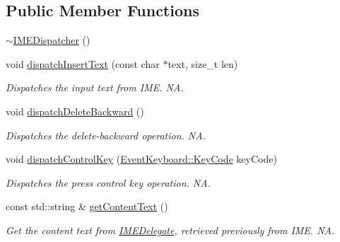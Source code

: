 \subsection*{Public Member Functions}
\begin{DoxyCompactItemize}
\item 
\hyperlink{classIMEDispatcher_a1324cb0b92e74c3c83a2b684732abe91}{$\sim$\+I\+M\+E\+Dispatcher} ()
\item 
\mbox{\label{classIMEDispatcher_a4600ab7b1ae11d351f0bd2cb411b02a5}} 
void \hyperlink{classIMEDispatcher_a4600ab7b1ae11d351f0bd2cb411b02a5}{dispatch\+Insert\+Text} (const char $\ast$text, size\+\_\+t len)
\begin{DoxyCompactList}\small\item\em Dispatches the input text from I\+ME.  NA. \end{DoxyCompactList}\item 
\mbox{\label{classIMEDispatcher_a77fc00411768c678ab6a09fe8890857c}} 
void \hyperlink{classIMEDispatcher_a77fc00411768c678ab6a09fe8890857c}{dispatch\+Delete\+Backward} ()
\begin{DoxyCompactList}\small\item\em Dispatches the delete-\/backward operation.  NA. \end{DoxyCompactList}\item 
\mbox{\label{classIMEDispatcher_a82a41660ae050d9d3124c83532ad26ca}} 
void \hyperlink{classIMEDispatcher_a82a41660ae050d9d3124c83532ad26ca}{dispatch\+Control\+Key} (\hyperlink{classEventKeyboard_a7cd3fa46515673276ce8ec7f0e051606}{Event\+Keyboard\+::\+Key\+Code} key\+Code)
\begin{DoxyCompactList}\small\item\em Dispatches the press control key operation.  NA. \end{DoxyCompactList}\item 
\mbox{\label{classIMEDispatcher_a6a308a4b3927d57a07859a19cd5718db}} 
const std\+::string \& \hyperlink{classIMEDispatcher_a6a308a4b3927d57a07859a19cd5718db}{get\+Content\+Text} ()
\begin{DoxyCompactList}\small\item\em Get the content text from \hyperlink{classIMEDelegate}{I\+M\+E\+Delegate}, retrieved previously from I\+ME.  NA. \end{DoxyCompactList}\item 

\end{DoxyCompactItemize}
